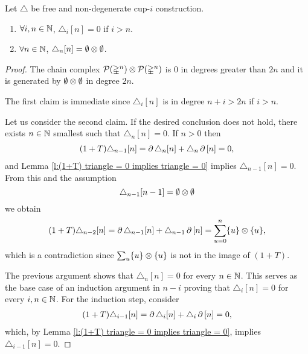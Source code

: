 %

\begin{lemma} \label{l:special cases i=n and i>n}
	Let $\triangle$ be free and non-degenerate cup-$i$ construction.
	\begin{enumerate}
		\item $\forall i,n \in \mathbb{N}$, $\triangle_i[n] = 0$ if $i > n$.
		\item $\forall n \in \mathbb{N}$, $\triangle_n[n] = \emptyset \otimes \emptyset$.
	\end{enumerate}
\end{lemma}

\begin{proof}
	The chain complex $\mathcal{P}(\mathbb{\Delta}^n) \otimes \mathcal{P}(\mathbb{\Delta}^n)$ is $0$ in degrees greater than $2n$ and it is generated by $\emptyset \otimes \emptyset$ in degree $2n$.

	The first claim is immediate since $\triangle_i[n]$ is in degree $n+i > 2n$ if $i > n$.

	Let us consider the second claim.
	If the desired conclusion does not hold, there exists $n \in \mathbb{N}$ smallest such that $\triangle_n [n] = 0$.
	If $n > 0$ then
	\begin{align*}
	(1+T) \triangle_{n-1} [n] =
	\operatorname{\partial} \triangle_{n} [n] + \triangle_{n} \operatorname{\partial} \, [n] = 0,
	\end{align*}
	and Lemma \ref{l:(1+T) triangle = 0 implies triangle = 0} implies $\triangle_{n-1} [n] = 0$.
	From this and the assumption
	\[
	\triangle_{n-1}[n-1] = \emptyset \otimes \emptyset
	\]
	we obtain
	\begin{equation}
	\begin{split}
	(1+T)\triangle_{n-2} [n] =
	\operatorname{\partial} \triangle_{n-1} [n] + \triangle_{n-1} \operatorname{\partial} \, [n] =
	\sum_{u = 0}^n \{u\} \otimes \{u\},
	\end{split}
	\end{equation}
		which is a contradiction since $\sum_u \{u\} \otimes \{u\}$ is not in the image of $(1+T)$.

	The previous argument shows that $\triangle_n [n] = 0$ for every $n \in \mathbb{N}$.
	This serves as the base case of an induction argument in $n-i$ proving that $\triangle_i [n] = 0$ for every $i, n \in \mathbb{N}$.
	For the induction step, consider
	\begin{align*}
	(1+T) \triangle_{i-1} [n] =
	\operatorname{\partial} \triangle_{i} [n] + \triangle_{i} \operatorname{\partial}\, [n] = 0,
	\end{align*}
	which, by Lemma \ref{l:(1+T) triangle = 0 implies triangle = 0}, implies $\triangle_{i-1} [n] = 0$.
\end{proof}

